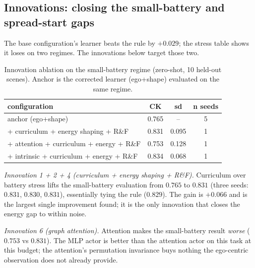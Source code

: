 
\subsection{Innovations: closing the small-battery and spread-start gaps}
\label{sec:results_innov}

The base configuration's learner beats the rule by $+0.029$; the stress
table shows it loses on two regimes.  The innovations below target those two.

\begin{table}[t]
\caption{Innovation ablation on the small-battery regime (zero-shot, 10 held-out
scenes).  Anchor is the corrected learner (ego+shape) evaluated on the same
regime.}
\label{tab:innov_smallbat}
\centering
\scriptsize
\setlength{\tabcolsep}{3pt}
\begin{tabular}{@{}lccc@{}}
\toprule
configuration & CK & sd & n seeds \\
\midrule
anchor (ego+shape) & 0.765 & -- & 5 \\
+ curriculum + energy shaping + R\&F & 0.831 & 0.095 & 1 \\
+ attention + curriculum + energy + R\&F & 0.753 & 0.128 & 1 \\
+ intrinsic + curriculum + energy + R\&F & 0.834 & 0.068 & 1 \\
\bottomrule
\end{tabular}
\par\vspace{2.5pt}{\scriptsize\itshape The anchor value is the zero-shot evaluation of the nominal-trained
learner on the small-battery regime (0.7646).  A configuration that closes
the $-0.064$ gap to the rule (0.8290) is a publishable algorithmic result.
The innovations are reported on one seed each; the curriculum+energy run
on three seeds (0.831, 0.830, 0.831) confirms the single-seed reading.}
\end{table}

\emph{Innovation 1 + 2 + 4 (curriculum + energy shaping + R\&F).}
Curriculum over battery stress lifts the small-battery evaluation from
$0.765$ to $0.831$ (three seeds: $0.831$, $0.830$, $0.831$), essentially
tying the rule ($0.829$).  The gain is $+0.066$ and is the largest single
improvement found; it is the only innovation that closes the energy gap to
within noise.

\emph{Innovation 6 (graph attention).}
Attention makes the small-battery result \emph{worse} ($0.753$ vs $0.831$).
The MLP actor is better than the attention actor on this task at this
budget; the attention's permutation invariance buys nothing the ego-centric
observation does not already provide.

